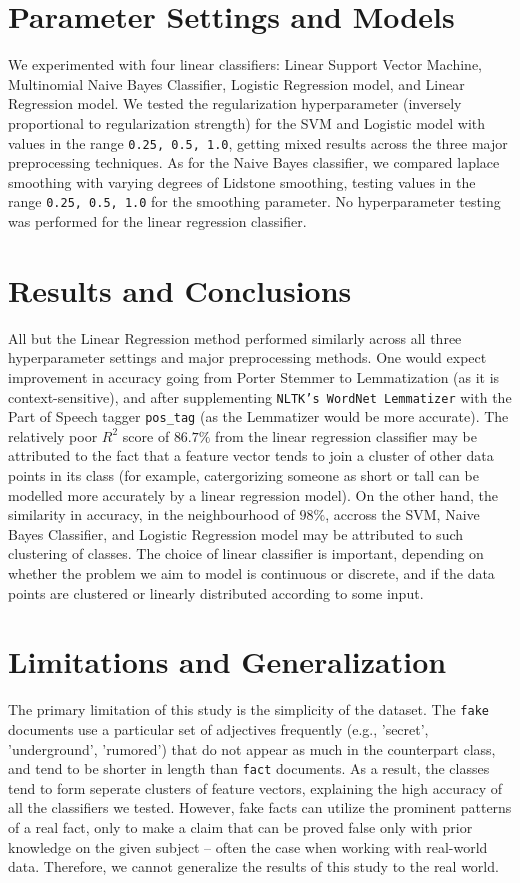 \documentclass[11pt]{article}
\begin{document}
\section{Parameter Settings and Models}
We experimented with four linear classifiers: Linear Support Vector Machine, Multinomial Naive Bayes Classifier, 
Logistic Regression model, and Linear Regression model. We tested the regularization 
hyperparameter (inversely proportional to regularization strength) 
for the SVM and Logistic model with values in the range \texttt{0.25, 0.5, 1.0}, 
getting mixed results across the three major preprocessing techniques. 
As for the Naive Bayes classifier, we compared laplace smoothing with varying degrees of Lidstone smoothing,
testing values in the range \texttt{{0.25, 0.5, 1.0}} for the smoothing parameter.
No hyperparameter testing was performed for the linear regression classifier.

\section{Results and Conclusions}
All but the Linear Regression method
performed similarly across all three hyperparameter settings 
and major preprocessing methods. 
One would expect improvement in accuracy going from 
Porter Stemmer to Lemmatization 
(as it is context-sensitive),
and after supplementing \texttt{NLTK's WordNet Lemmatizer} 
with the Part of Speech tagger \texttt{pos\_tag}
(as the Lemmatizer would be more accurate). The relatively 
poor $R^2$ score of $86.7\%$ from the linear regression classifier
may be attributed to the fact that a feature vector tends to join
a cluster of other data points in its class
(for example, catergorizing someone as short or tall can 
be modelled more accurately by a linear regression model). On the other hand,
the similarity in accuracy, in the neighbourhood of $98\%$, accross the 
SVM, Naive Bayes Classifier, and Logistic Regression model may be attributed
to such clustering of classes. 
The choice of linear classifier is important, depending
on whether the problem we aim to model is continuous or discrete, and if
the data points are clustered or linearly distributed according to some input. 

\section{Limitations and Generalization}
The primary limitation of this study is the simplicity of the dataset.
The \texttt{fake} documents use a particular set of adjectives 
frequently (e.g., 'secret', 'underground', 'rumored')
that do not appear as much in the counterpart class, and
tend to be shorter in length than \texttt{fact} documents.
As a result, the classes tend to form seperate clusters of feature vectors,
explaining the high accuracy of all the classifiers we tested. However,
fake facts can utilize the prominent patterns
of a real fact, only to make a claim that can be proved 
false only with prior knowledge on the given subject – often the case when working with real-world data.
Therefore, we cannot generalize the results of this study to the real world.
\end{document}
